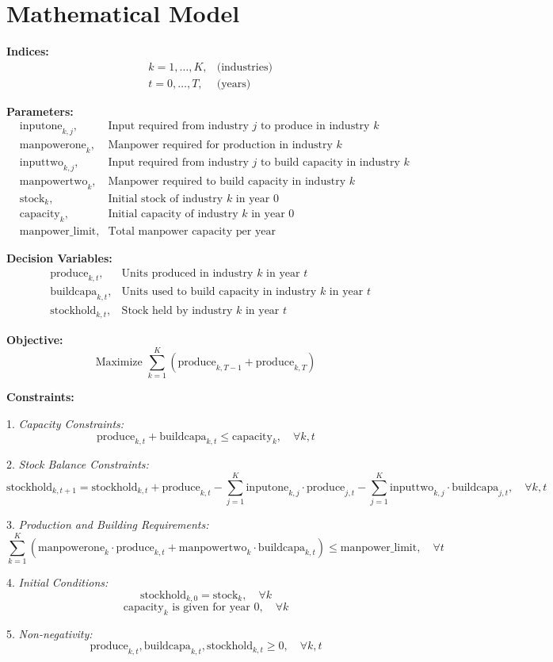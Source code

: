 \documentclass{article}
\begin{document}
\section*{Mathematical Model}

\textbf{Indices:}
\begin{align*}
& k = 1, \ldots, K, & \text{(industries)} \\
& t = 0, \ldots, T, & \text{(years)}
\end{align*}

\textbf{Parameters:}
\begin{align*}
& \text{inputone}_{k,j}, & \text{Input required from industry } j \text{ to produce in industry } k \\
& \text{manpowerone}_{k}, & \text{Manpower required for production in industry } k \\
& \text{inputtwo}_{k,j}, & \text{Input required from industry } j \text{ to build capacity in industry } k \\
& \text{manpowertwo}_{k}, & \text{Manpower required to build capacity in industry } k \\
& \text{stock}_{k}, & \text{Initial stock of industry } k \text{ in year 0} \\
& \text{capacity}_{k}, & \text{Initial capacity of industry } k \text{ in year 0} \\
& \text{manpower\_limit}, & \text{Total manpower capacity per year}
\end{align*}

\textbf{Decision Variables:}
\begin{align*}
& \text{produce}_{k,t}, & \text{Units produced in industry } k \text{ in year } t \\
& \text{buildcapa}_{k,t}, & \text{Units used to build capacity in industry } k \text{ in year } t \\
& \text{stockhold}_{k,t}, & \text{Stock held by industry } k \text{ in year } t 
\end{align*}

\textbf{Objective:}
\[
\text{Maximize } \sum_{k=1}^{K} \left( \text{produce}_{k,T-1} + \text{produce}_{k,T} \right)
\]

\textbf{Constraints:}

1. \textit{Capacity Constraints:}
\[
\text{produce}_{k,t} + \text{buildcapa}_{k,t} \leq \text{capacity}_{k}, \quad \forall k, t
\]

2. \textit{Stock Balance Constraints:}
\[
\text{stockhold}_{k,t+1} = \text{stockhold}_{k,t} + \text{produce}_{k,t} - \sum_{j=1}^{K} \text{inputone}_{k,j} \cdot \text{produce}_{j,t} - \sum_{j=1}^{K} \text{inputtwo}_{k,j} \cdot \text{buildcapa}_{j,t}, \quad \forall k, t
\]

3. \textit{Production and Building Requirements:}
\[
\sum_{k=1}^{K} \left( \text{manpowerone}_{k} \cdot \text{produce}_{k,t} + \text{manpowertwo}_{k} \cdot \text{buildcapa}_{k,t} \right) \leq \text{manpower\_limit}, \quad \forall t
\]

4. \textit{Initial Conditions:}
\[
\text{stockhold}_{k,0} = \text{stock}_{k}, \quad \forall k
\]
\[
\text{capacity}_{k} \text{ is given for year 0}, \quad \forall k
\]

5. \textit{Non-negativity:}
\[
\text{produce}_{k,t}, \text{buildcapa}_{k,t}, \text{stockhold}_{k,t} \geq 0, \quad \forall k, t
\]
\end{document}
